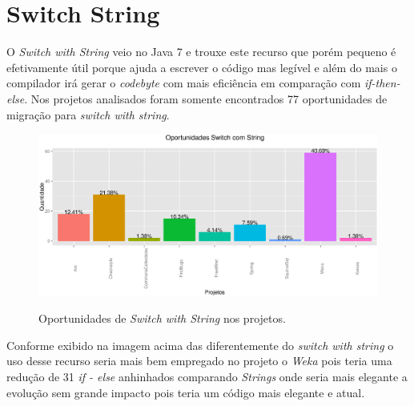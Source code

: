 \section{Switch String}

O \textit{Switch with String} veio no Java 7 e trouxe este recurso que porém pequeno é efetivamente útil porque ajuda a escrever o código mas legível e além do mais o compilador 
irá gerar o \textit{codebyte} com mais eficiência em comparação com \textit{if-then-else}. Nos projetos analisados foram somente encontrados 77 oportunidades de migração para \textit{switch with string}.

\begin{figure}[h]
	\center
	\includegraphics[scale=0.5]{Imagens/oportunidadesSwitchString}
	\label{fig:Switch with String}
	\caption{Oportunidades de \textit{Switch with String} nos projetos.}
\end{figure}

Conforme exibido na imagem acima das diferentemente do \textit{switch with string} o uso desse recurso seria mais bem empregado no projeto o \textit{Weka} pois teria uma redução de 31 \textit{if - else} anhinhados comparando \textit{Strings} onde seria mais elegante a evolução sem grande impacto pois teria um código mais elegante e atual.
